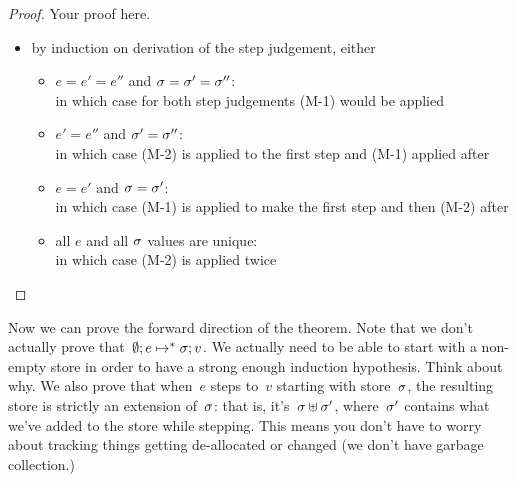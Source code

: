 \documentclass{article}
\begin{document}
\begin{proof}
  Your proof here.
  \begin{itemize}
    \item by induction on derivation of the step judgement, either
        \begin{itemize}
            \item $e = e' = e''$ and $\sigma = \sigma' = \sigma''$:\\
                in which case for both step judgements (M-1) would be applied
                
            \item $e' = e''$ and $\sigma' = \sigma''$:\\
                in which case (M-2) is applied to the first step and (M-1) applied after
            \item $e = e'$ and $\sigma = \sigma'$:\\
                in which case (M-1) is applied to make the first step and then (M-2) after
                
            \item all $e$ and all $\sigma$ values are unique:\\
                in which case (M-2) is applied twice
        \end{itemize}
  \end{itemize}
\end{proof}

Now we can prove the forward direction of the theorem.
%
Note that we don't actually prove
that~$\emptyset; e \mapsto^* \sigma; v$.
%
We actually need to be able to start with a non-empty store in order to
have a strong enough induction hypothesis.
%
Think about why.
%
We also prove that when~$e$ steps to~$v$ starting with store~$\sigma$,
the resulting store is strictly an extension of~$\sigma$: that is,
it's~$\sigma \uplus \sigma'$, where~$\sigma'$ contains what we've added
to the store while stepping.
%
This means you don't have to worry about tracking things getting de-allocated
or changed (we don't have garbage collection.)
\end{document}
